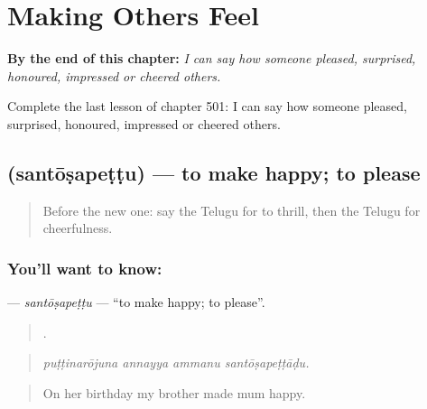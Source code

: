 
\chapter{Making Others Feel}
\label{ch:te-making-others-feel}

\begin{chapteropening}
\textbf{By the end of this chapter:} \emph{I can say how someone pleased, surprised, honoured, impressed or cheered others.}

Complete the last lesson of chapter 501: I can say how someone pleased, surprised, honoured, impressed or cheered others.
\end{chapteropening}

\section[\texorpdfstring{\te{సంతోషపెట్టు} (santōṣapeṭṭu)}{సంతోషపెట్టు (santōṣapeṭṭu)}]{ (santōṣapeṭṭu) — to make happy; to please}

\label{lesson:TE-C501-santosapettu}



\begin{quote}
Before the new one: say the Telugu for to thrill, then the Telugu for cheerfulness.
\end{quote}

\subsection*{You'll want to know: }
\textbf{} — \emph{santōṣapeṭṭu} — \textquotedblleft{}to make happy; to please\textquotedblright{}.

\begin{quote}
   .
\end{quote}

\begin{quote}
\emph{puṭṭinarōjuna annayya ammanu santōṣapeṭṭāḍu.}
\end{quote}

\begin{quote}
On her birthday my brother made mum happy.
\end{quote}

